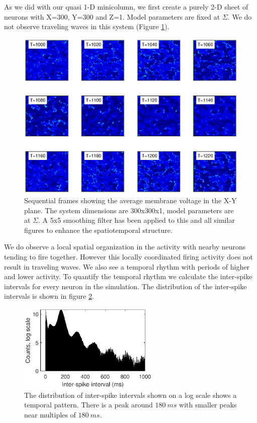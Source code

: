 As we did with our quasi 1-D minicolumn, we first create a purely 2-D sheet of neurons with X=300, Y=300 and Z=1.
Model parameters are fixed at $\Sigma$.
We do not observe traveling waves in this system (Figure \ref{fig:Pure2DRasters_NoWaves}).
\begin{figure}[!htb]
 \caption{Sequential frames showing the average membrane voltage in the X-Y plane.
          The system dimensions are 300x300x1, model parameters are at $\Sigma$. 
	  A 5x5 smoothing filter has been applied to this and all similar figures to enhance the spatiotemporal structure.}
 \label{fig:Pure2DRasters_NoWaves}
 \centering
   \includegraphics[width=\textwidth]{fig/2D_1LayerNoWaves}
\end{figure}
\FloatBarrier

We do observe a local spatial organization in the activity with nearby neurons tending to fire together.
However this locally coordinated firing activity does not result in traveling waves.
We also see a temporal rhythm with periods of higher and lower activity.
To quantify the temporal rhythm we calculate the inter-spike intervals for every neuron in the simulation.
The distribution of the inter-spike intervals is shown in figure \ref{fig:2D1LayerRhythm}.
\begin{figure}[!htb]
 \caption{The distribution of inter-spike intervals shown on a log scale shows a temporal pattern.
          There is a peak around $180~ms$ with smaller peaks near multiples of $180~ms$.
         }
 \label{fig:2D1LayerRhythm}
 \centering
   \includegraphics[width=0.6\textwidth]{fig/2D_1Layer_ISI_log}
\end{figure}

